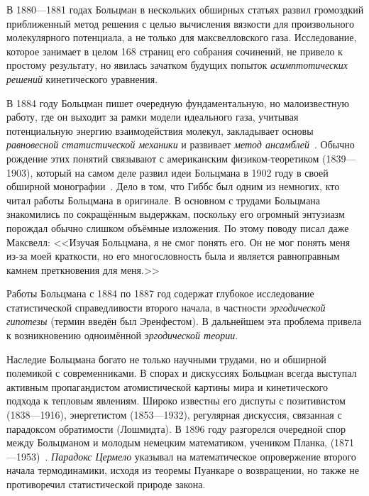 \documentclass[a4paper, 12pt, oneside]{article} %
\begin{document}
В 1880---1881 годах Больцман в нескольких обширных статьях развил
громоздкий приближенный метод решения с целью вычисления вязкости для
произвольного молекулярного потенциала, а не только для максвелловского
газа. Исследование, которое занимает в целом 168 страниц его собрания
сочинений, не привело к простому результату, но явилась зачатком будущих
попыток \emph{асимптотических решений} кинетического уравнения.

В 1884 году Больцман пишет очередную фундаментальную, но малоизвестную
работу, где он выходит за рамки модели идеального газа, учитывая
потенциальную энергию взаимодействия молекул, закладывает основы
\emph{равновесной статистической механики} и развивает \emph{метод
ансамблей}~\cite{boltzmann1885ansambles}. Обычно рождение этих понятий
связывают с американским физиком-теоретиком 
(1839---1903), который на самом деле развил идеи Больцмана в 1902 году в
своей обширной монографии~\cite{gibbs1902ansambles}. Дело в том, что
Гиббс был одним из немногих, кто читал работы Больцмана в оригинале. В
основном с трудами Больцмана знакомились по сокращённым выдержкам,
поскольку его огромный энтузиазм порождал обычно слишком объёмные
изложения. По этому поводу писал даже Максвелл: <<Изучая Больцмана, я не
смог понять его. Он не мог понять меня из-за моей краткости, но его
многословность была и является равноправным камнем преткновения для
меня.>>

Работы Больцмана с 1884 по 1887 год содержат глубокое исследование
статистической справедливости второго начала, в частности
\emph{эргодической гипотезы} (термин введён был Эренфестом). В
дальнейшем эта проблема привела к возникновению одноимённой
\emph{эргодической теории}.

Наследие Больцмана богато не только научными трудами, но и обширной
полемикой с современниками. В спорах и дискуссиях Больцман всегда
выступал активным пропагандистом атомистической картины мира и
кинетического подхода к тепловым явлениям. Широко известны его диспуты с
позитивистом  (1838---1916), энергетистом
 (1853---1932), регулярная дискуссия,
связанная с парадоксом обратимости (Лошмидта). В 1896 году разгорелся
очередной спор между Больцманом и молодым немецким математиком, учеником
Планка, 
(1871---1953)~\cite{zermelo1896paradox}. \emph{Парадокс Цермело}
указывал на математическое опровержение второго начала термодинамики,
исходя из теоремы Пуанкаре о возвращении, но также не противоречил
статистической природе закона.
\end{document}
